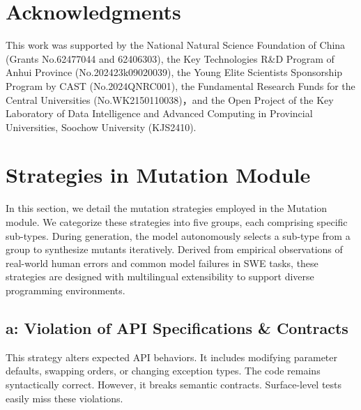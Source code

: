 \documentclass[11pt]{article}
\begin{document}
\section*{Acknowledgments}
This work was supported by the National Natural Science Foundation of China (Grants No.62477044 and 62406303), the Key Technologies R\&D Program of Anhui Province (No.202423k09020039), the Young Elite Scientists Sponsorship Program by CAST (No.2024QNRC001), the Fundamental Research Funds for the Central Universities (No.WK2150110038)，and the Open Project of the Key Laboratory of Data Intelligence and Advanced Computing in Provincial Universities, Soochow University (KJS2410).

%



\appendix

\section{Strategies in Mutation Module}
\label{sec:Strategies in Mutation Module}
In this section, we detail the mutation strategies employed in the Mutation module. We categorize these strategies into five groups, each comprising specific sub-types. During generation, the model autonomously selects a sub-type from a group to synthesize mutants iteratively. Derived from empirical observations of real-world human errors and common model failures in SWE tasks, these strategies are designed with multilingual extensibility to support diverse programming environments.

\subsection*{a: Violation of API Specifications \& Contracts}
This strategy alters expected API behaviors. It includes modifying parameter defaults, swapping orders, or changing exception types. The code remains syntactically correct. However, it breaks semantic contracts. Surface-level tests easily miss these violations.
\end{document}
